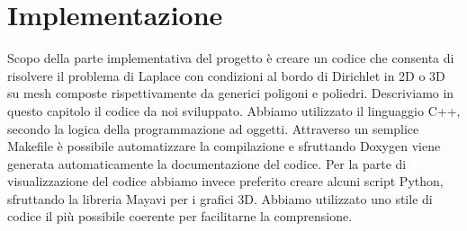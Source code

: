 \documentclass[oneside,12pt]{book}  %
\theoremstyle{plain}
\theoremstyle{definition}
\theoremstyle{remark}
\numberwithin{equation}{chapter} %
\begin{document}
 

\chapter{Implementazione}
\label{ch:implementazione}

Scopo della parte implementativa del progetto \`e creare un codice che consenta di risolvere
il problema di Laplace con condizioni al bordo di Dirichlet in 2D o 3D
su mesh composte rispettivamente da generici poligoni e poliedri.
Descriviamo in questo capitolo il codice da noi sviluppato. Abbiamo
utilizzato il linguaggio C++, secondo la logica della programmazione
ad oggetti. Attraverso un semplice Makefile \`e possibile automatizzare la
compilazione e sfruttando Doxygen viene generata automaticamente la
documentazione del codice.
Per la parte di visualizzazione del codice abbiamo invece preferito
creare alcuni script Python, sfruttando la libreria Mayavi per i
grafici 3D.
Abbiamo utilizzato uno stile di codice il pi\`u possibile coerente per
facilitarne la comprensione.
\end{document}
